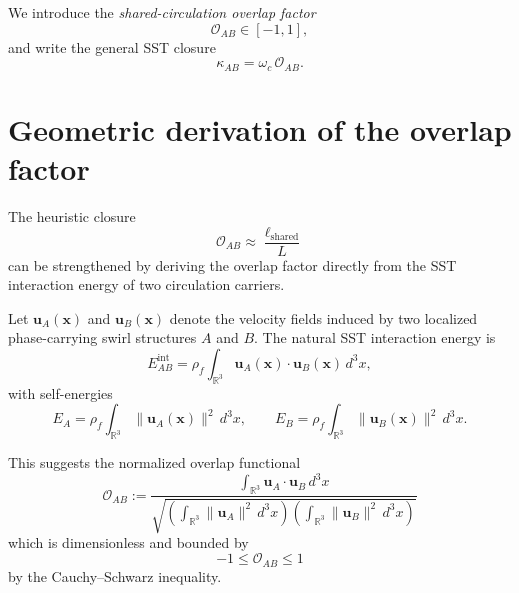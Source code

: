 \documentclass[11pt]{article}
\begin{document}
        We introduce the \emph{shared-circulation overlap factor}
        \begin{equation}
            \mathcal{O}_{AB}\in[-1,1],
        \end{equation}
        and write the general SST closure
        \begin{equation}
            \boxed{
                \kappa_{AB}=\omega_c\,\mathcal{O}_{AB}.
            }
            \label{eq:kappa_general}
        \end{equation}
    
    \section{Geometric derivation of the overlap factor}
        
        The heuristic closure
        \[
            \mathcal{O}_{AB}\approx \frac{\ell_{\mathrm{shared}}}{L}
        \]
        can be strengthened by deriving the overlap factor directly from the SST interaction energy of two circulation carriers.
        
        Let \(\mathbf{u}_A(\mathbf{x})\) and \(\mathbf{u}_B(\mathbf{x})\) denote the velocity fields induced by two localized phase-carrying swirl structures \(A\) and \(B\). The natural SST interaction energy is
        \begin{equation}
            E_{AB}^{\mathrm{int}}
            =
            \rho_{\!f}\int_{\mathbb{R}^3}
            \mathbf{u}_A(\mathbf{x})\cdot \mathbf{u}_B(\mathbf{x})\,d^3x,
            \label{eq:EABint}
        \end{equation}
        with self-energies
        \begin{equation}
            E_A
            =
            \rho_{\!f}\int_{\mathbb{R}^3}\|\mathbf{u}_A(\mathbf{x})\|^2\,d^3x,
            \qquad
            E_B
            =
            \rho_{\!f}\int_{\mathbb{R}^3}\|\mathbf{u}_B(\mathbf{x})\|^2\,d^3x.
            \label{eq:EAEB}
        \end{equation}
        
        This suggests the normalized overlap functional
        \begin{equation}
            \boxed{
                \mathcal{O}_{AB}
                :=
                \frac{\displaystyle \int_{\mathbb{R}^3}\mathbf{u}_A\cdot \mathbf{u}_B\,d^3x}
                {\displaystyle
                \sqrt{
                    \left(\int_{\mathbb{R}^3}\|\mathbf{u}_A\|^2\,d^3x\right)
                    \left(\int_{\mathbb{R}^3}\|\mathbf{u}_B\|^2\,d^3x\right)
                }}
            }
            \label{eq:OAB_energy}
        \end{equation}
        which is dimensionless and bounded by
        \begin{equation}
            -1 \le \mathcal{O}_{AB}\le 1
        \end{equation}
        by the Cauchy--Schwarz inequality.
\end{document}
